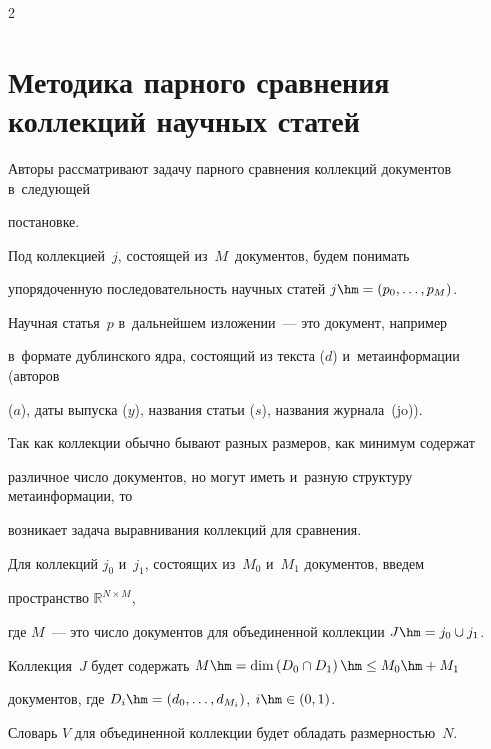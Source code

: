 \begin{multicols}{2}
    


    \section{Методика парного сравнения коллекций научных статей}


    


    Авторы рассматривают задачу парного сравнения коллекций документов в~следующей 


    постановке.


    Под коллекцией~$j$, состоящей из~$M$~документов, будем понимать 


упорядоченную последовательность научных статей $j \hm= \left(p_0, \dots , p_M 


\right)$.


    Научная статья~$p$ в~дальнейшем изложении~--- это документ, например 


    в~формате дублинского ядра, состоящий из текста ($d$) и~метаинформации (авторов 


($a$), даты выпуска ($y$), названия статьи ($s$), названия журнала~(jo)).


    


    Так как коллекции обычно бывают разных размеров, как минимум содержат 


различное число документов, но могут иметь и~разную структуру метаинформации, то 


возникает задача выравнивания коллекций для сравнения.


    


    Для коллекций $j_0$ и~$j_1$,  состоящих из~$M_0$ и~$M_1$ документов, введем 


пространство $\mathbb{R}^{N \times M}$,


где $M$~--- это число документов для объединенной коллекции $J \hm= j_0 \cup 


j_1 $.


    Коллекция~$J$ будет содержать $M \hm= \mathrm{dim}\left( D_0 \cap D_1 \right)


    \hm \le  M_0 \hm+ M_1 $ 


документов, где $D_i\hm = (d_0, \dots , d_{M_i})$, $i \hm\in (0,1)$.


    Словарь $V$ для объединенной коллекции будет обладать раз\-мер\-ностью~$N$.


    {


}
\end{multicols}
